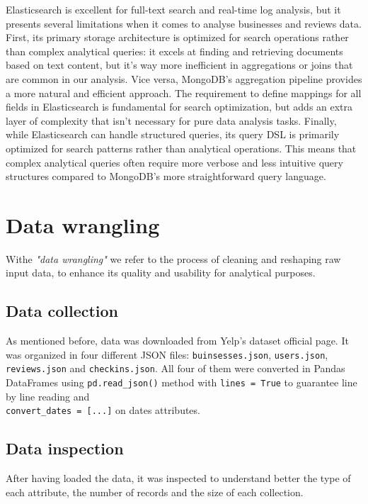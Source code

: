 \documentclass{Configuration_Files/PoliMi3i_thesis}
\begin{document}
Elasticsearch is excellent for full-text search and real-time log analysis, but it presents several limitations when it comes to analyse businesses and reviews data. First, its primary storage architecture is optimized for search operations rather than complex analytical queries: it excels at finding and retrieving documents based on text content, but it's way more inefficient in aggregations or joins that are common in our analysis. Vice versa, MongoDB's aggregation pipeline provides a more natural and efficient approach. 
The requirement to define mappings for all fields in Elasticsearch is fundamental for search optimization, but adds an extra layer of complexity that isn't necessary for pure data analysis tasks.
Finally, while Elasticsearch can handle structured queries, its query DSL is primarily optimized for search patterns rather than analytical operations. This means that complex analytical queries often require more verbose and less intuitive query structures compared to MongoDB's more straightforward query language.

\cleardoublepage
\chapter{Data wrangling}
\label{sec:Data wrangling}
Withe \textit{"data wrangling"} we refer to the process of cleaning and reshaping raw input data, to enhance its quality and usability for analytical purposes. 

\section{Data collection}
As mentioned before, data was downloaded from Yelp's dataset official page. It was organized in four different JSON files: \texttt{buinsesses.json}, \texttt{users.json}, \texttt{reviews.json} and \texttt{checkins.json}. All four of them were converted in Pandas DataFrames using \verb|pd.read_json()| method with \verb|lines = True| to guarantee line by line reading and \\\verb|convert_dates = [...]| on dates attributes. 

\section{Data inspection}
After having loaded the data, it was inspected to understand better the type of each attribute, the number of records and the size of each collection. 
\end{document}

